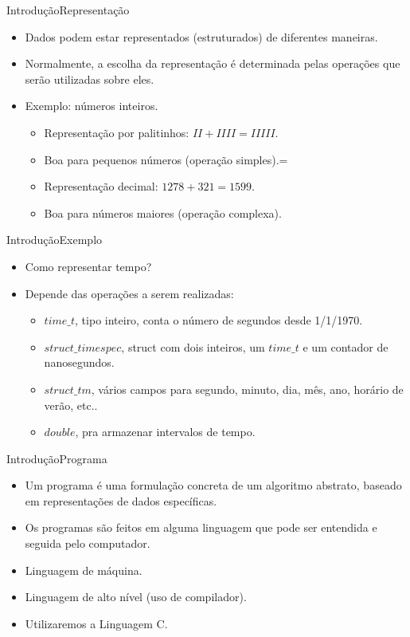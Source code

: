 \documentclass[aspectratio=169]{beamer}
\begin{document}

\begin{frame}{Introdução}{Representação}
\begin{itemize}
\item Dados podem estar representados (estruturados) de diferentes maneiras.
\item Normalmente, a escolha da representação é determinada pelas operações que serão utilizadas sobre eles.
\item Exemplo: números inteiros.
\begin{itemize}
\item Representação por palitinhos: $II + IIII = IIIII$. 
\item Boa para pequenos números (operação simples).=
\item Representação decimal: $1278 + 321 = 1599$.
\item Boa para números maiores (operação complexa).
\end{itemize}
\end{itemize}
\end{frame}


\begin{frame}{Introdução}{Exemplo}
\begin{itemize}
\item Como representar tempo?
\item Depende das operações a serem realizadas:
\begin{itemize}
\item $time\_t$, tipo inteiro, conta o número de segundos desde 1/1/1970.
\item $struct\_timespec$, struct com dois inteiros, um $time\_t$ e um contador de nanosegundos.
\item $struct\_tm$, vários campos para segundo, minuto, dia, mês, ano, horário de verão, etc..
\item $double$, pra armazenar intervalos de tempo.
\end{itemize}
\end{itemize}
\end{frame}


\begin{frame}{Introdução}{Programa}
\begin{itemize}
\item Um programa é uma formulação concreta de um algoritmo abstrato, baseado em representações de dados específicas.
\item Os programas são feitos em alguma linguagem que pode ser entendida e seguida pelo 
computador.
\item Linguagem de máquina.
\item Linguagem de alto nível (uso de compilador).
\item Utilizaremos a Linguagem C.
\end{itemize}
\end{frame}
\end{document}
